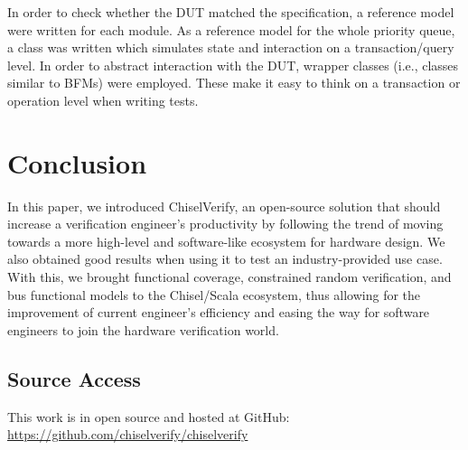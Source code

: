 \documentclass[conference]{IEEEtran}
\begin{document}
In order to check whether the DUT matched the specification, a reference model were written for each module. 
As a reference model for the whole priority queue, a class 
was written which simulates state and interaction on a transaction/query level. In order to abstract interaction with the DUT,
wrapper classes (i.e., classes similar to BFMs) were employed. These make it easy to think on a transaction or 
operation level when writing tests.

\section{Conclusion}
In this paper, we introduced ChiselVerify, an open-source solution that should increase a verification engineer's productivity by following the trend of moving towards a more high-level and software-like ecosystem for hardware design. 
We also obtained good results when using it to test an industry-provided use case.
With this, we brought functional coverage, constrained random verification, and bus functional models to the Chisel/Scala ecosystem, thus allowing for the improvement of current engineer's efficiency and easing the way for software engineers to join the hardware verification world.

\subsection*{Source Access}

This work is in open source and hosted at GitHub: \url{https://github.com/chiselverify/chiselverify}




\end{document}
